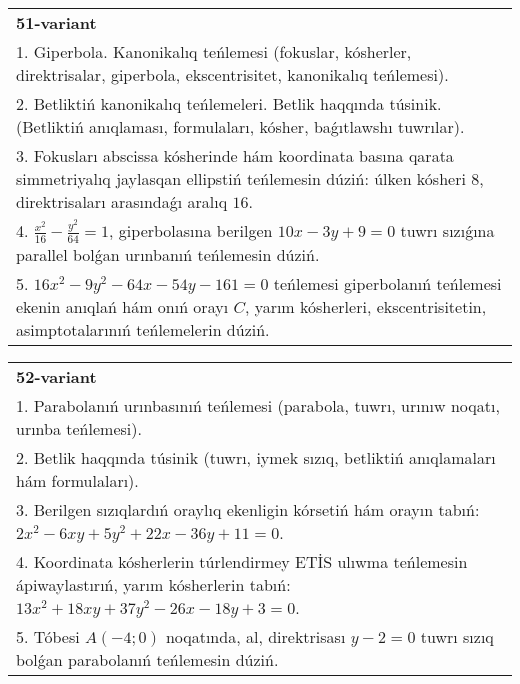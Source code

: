 \documentclass{article}
\begin{document}
\begin{tabular}{m{17cm}}
\textbf{51-variant}\\
1. Giperbola. Kanonikalıq teńlemesi (fokuslar, kósherler, direktrisalar, giperbola, ekscentrisitet, kanonikalıq teńlemesi).\\

2. Betliktiń kanonikalıq teńlemeleri. Betlik haqqında túsinik. (Betliktiń anıqlaması, formulaları, kósher, baǵıtlawshı tuwrılar).\\

3. Fokusları abscissa kósherinde hám koordinata basına qarata simmetriyalıq jaylasqan ellipstiń teńlemesin dúziń: úlken kósheri $8$, direktrisaları arasındaǵı aralıq $16$.\\

4. $\frac{x^{2}}{16} - \frac{y^{2}}{64} = 1$, giperbolasına berilgen $10x - 3y + 9 = 0$ tuwrı sızıǵına parallel bolǵan urınbanıń teńlemesin dúziń.  \\

5. $16x^{2} - 9y^{2} - 64x - 54y - 161 = 0$ teńlemesi giperbolanıń teńlemesi ekenin anıqlań hám onıń orayı $C$, yarım kósherleri, ekscentrisitetin, asimptotalarınıń teńlemelerin dúziń.  
\end{tabular}
\vspace{1cm}


\begin{tabular}{m{17cm}}
\textbf{52-variant}\\
1. Parabolanıń urınbasınıń teńlemesi (parabola, tuwrı, urınıw noqatı, urınba teńlemesi).\\

2. Betlik haqqında túsinik (tuwrı, iymek sızıq, betliktiń anıqlamaları hám formulaları).\\

3. Berilgen sızıqlardıń oraylıq ekenligin kórsetiń hám orayın tabıń: $2 x^{2}-6 xy+5 y^{2}+22 x-36 y+11=0$.\\

4. Koordinata kósherlerin túrlendirmey ETİS ulıwma teńlemesin ápiwaylastırıń, yarım kósherlerin tabıń: $13x^{2} + 18xy + 37y^{2} - 26x - 18y + 3 = 0$.  \\

5. Tóbesi $A(-4;0)$ noqatında, al, direktrisası $y - 2 = 0$ tuwrı sızıq bolǵan parabolanıń teńlemesin dúziń.
\end{tabular}
\vspace{1cm}
\end{document}
